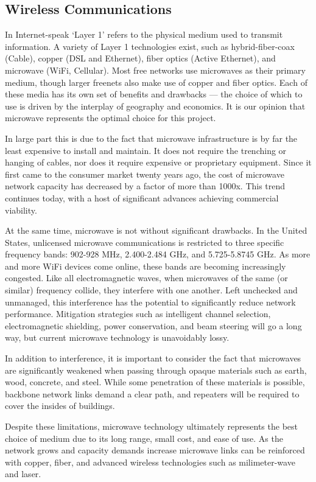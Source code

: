 \subsection{Wireless Communications}
In Internet-speak `Layer 1' refers to the physical medium used to transmit
information. A variety of Layer 1 technologies exist, such as hybrid-fiber-coax
(Cable), copper (DSL and Ethernet), fiber optics (Active Ethernet), and microwave
(WiFi, Cellular). Most free networks use microwaves as their primary medium, though larger
freenets also make use of copper and fiber optics. Each of these media
has its own set of benefits and drawbacks --- the choice of which to use is
driven by the interplay of geography and economics. It is our opinion that
microwave represents the optimal choice for this project. \par
In large part this is due to the fact that microwave infrastructure is by far
the least expensive to install and maintain. It does not require the
trenching or hanging of cables, nor does it require expensive or proprietary
equipment. Since it first came to the consumer market twenty years ago, the cost
of microwave network capacity has decreased by a factor of more than 1000x. This
trend continues today, with a host of significant advances achieving commercial
viability. \par
At the same time, microwave is not without significant drawbacks. In the United States,
unlicensed microwave communications is restricted to three specific frequency
bands: 902-928 MHz, 2.400-2.484 GHz, and 5.725-5.8745 GHz. As more and more WiFi
devices come online, these bands are becoming increasingly congested. Like
all electromagnetic waves, when microwaves of the same (or similar)
frequency collide, they interfere with one another. Left unchecked and unmanaged,
this interference has the potential to significantly reduce network performance. 
Mitigation strategies such
as intelligent channel selection, electromagnetic shielding, power conservation,
and beam steering will go a long way, but current microwave technology is
unavoidably lossy.\par
In addition to interference, it is important to consider the fact that
microwaves are significantly weakened when passing through opaque materials such
as earth, wood, concrete, and steel. While some penetration of these materials
is possible, backbone network links demand a clear path, and
repeaters will be required to cover the insides of buildings.  \par 
Despite these limitations, microwave technology ultimately represents the best
choice of medium due to its long range, small cost, and ease of use. As the
network grows and capacity demands increase microwave links can be reinforced with 
copper, fiber, and advanced wireless technologies such as milimeter-wave and laser.\par
 
